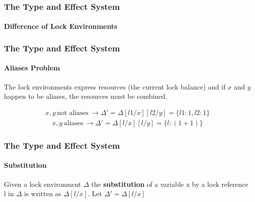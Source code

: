 \begin{frame}
\frametitle{The Type and Effect System}
\framesubtitle{Difference of Lock Environments}

\begin{prooftree}
\end{prooftree}

\begin{prooftree}
\end{prooftree}

\begin{prooftree}
\end{prooftree}

\end{frame}


\begin{frame}
\frametitle{The Type and Effect System}
\framesubtitle{Aliases Problem}

The lock environments express resources (the current lock balance) and if $x$ and $y$ happen to be aliases, the resources must be combined.

\begin{align}
    x, y ~\text{not aliases}~ \rightarrow 
    \Delta' = \Delta [l1/x] [l2/y] = \{l1:1, l2:1\}
\end{align}
\begin{align}
    x, y ~\text{aliases}~ \rightarrow 
    \Delta' = \Delta [l/x] [l/y] = \{l:(1+1)\}
\end{align}
\end{frame}

\begin{frame}
\frametitle{The Type and Effect System}
\framesubtitle{Substitution}

\begin{definition}
Given a lock environment $\Delta$ the \textbf{substitution} of a variable x by a lock reference l in $\Delta$ is written as $\Delta[l/x]$. Let $\Delta' = \Delta [l/x]$
\end{definition}
\begin{prooftree}
\end{prooftree}

\begin{prooftree}
\end{prooftree}
\end{frame}

